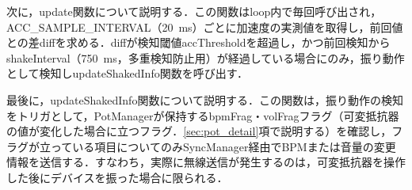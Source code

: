 % 
% 
% 

次に，update関数について説明する．この関数はloop内で毎回呼び出され，ACC\_SAMPLE\_INTERVAL（\SI{20}{ms}）ごとに加速度の実測値を取得し，前回値との差diffを求める．diffが検知閾値accThresholdを超過し，かつ前回検知からshakeInterval（\SI{750}{ms}，多重検知防止用）が経過している場合にのみ，振り動作として検知しupdateShakedInfo関数を呼び出す．

% 
% 

最後に，updateShakedInfo関数について説明する．この関数は，振り動作の検知をトリガとして，PotManagerが保持するbpmFrag・volFragフラグ（可変抵抗器の値が変化した場合に立つフラグ．\ref{sec:pot_detail}項で説明する）を確認し，フラグが立っている項目についてのみSyncManager経由でBPMまたは音量の変更情報を送信する．すなわち，実際に無線送信が発生するのは，可変抵抗器を操作した後にデバイスを振った場合に限られる．

